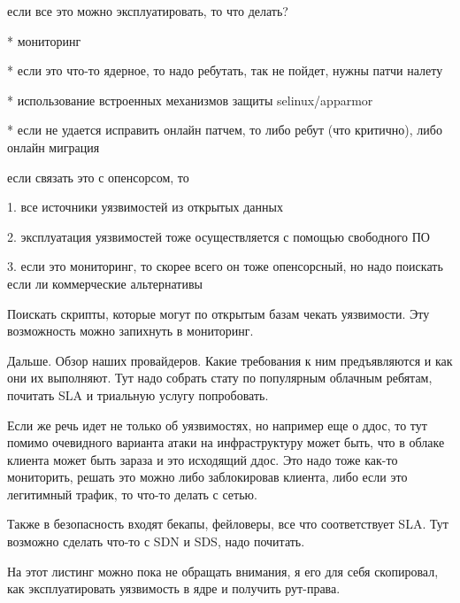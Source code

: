 если все это можно эксплуатировать, то что делать?

* мониторинг

* если это что-то ядерное, то надо ребутать, так не пойдет, нужны патчи налету

* использование встроенных механизмов защиты selinux/apparmor

* если не удается исправить онлайн патчем, то либо ребут (что критично), либо онлайн миграция


если связать это с опенсорсом, то

1. все источники уязвимостей из открытых данных

2. эксплуатация уязвимостей тоже осуществляется с помощью свободного ПО

3. если это мониторинг, то скорее всего он тоже опенсорсный, но надо поискать если ли коммерческие альтернативы

Поискать скрипты, которые могут по открытым базам чекать уязвимости.
Эту возможность можно запихнуть в мониторинг.


Дальше.
Обзор наших провайдеров.
Какие требования к ним предъявляются и как они их выполняют.
Тут надо собрать стату по популярным облачным ребятам, почитать SLA и триальную услугу попробовать.

Если же речь идет не только об уязвимостях, но например еще о ддос, то тут помимо очевидного варианта атаки на инфраструктуру может быть, что в облаке клиента может быть зараза и это исходящий ддос.
Это надо тоже как-то мониторить, решать это можно либо заблокировав клиента, либо если это легитимный трафик, то что-то делать с сетью.

Также в безопасность входят бекапы, фейловеры, все что соответствует SLA.
Тут возможно сделать что-то с SDN и SDS, надо почитать.


На этот листинг можно пока не обращать внимания, я его для себя скопировал, как эксплуатировать уязвимость в ядре и получить рут-права.

